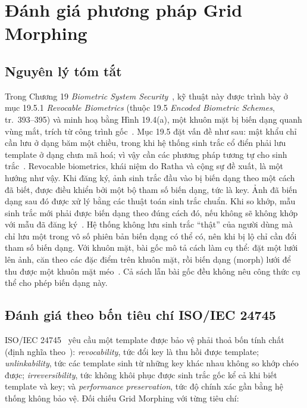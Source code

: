 \documentclass[12pt,a4paper]{article}
\begin{document}
\section{Đánh giá phương pháp Grid Morphing}

\subsection{Nguyên lý tóm tắt}
Trong Chương 19 \emph{Biometric System Security}~\cite{adler2008}, kỹ thuật này được trình bày ở mục 19.5.1 \emph{Revocable Biometrics} (thuộc 19.5 \emph{Encoded Biometric Schemes}, tr.~393--395) và minh hoạ bằng Hình 19.4(a), một khuôn mặt bị biến dạng quanh vùng mắt, trích từ công trình gốc~\cite{ratha2001}. Mục 19.5 đặt vấn đề như sau: mật khẩu chỉ cần lưu ở dạng băm một chiều, trong khi hệ thống sinh trắc cổ điển phải lưu template ở dạng chưa mã hoá; vì vậy cần các phương pháp tương tự cho sinh trắc~\cite[tr.~393]{adler2008}. Revocable biometrics, khái niệm do Ratha và cộng sự đề xuất, là một hướng như vậy. Khi đăng ký, ảnh sinh trắc đầu vào bị biến dạng theo một cách đã biết, được điều khiển bởi một bộ tham số biến dạng, tức là key. Ảnh đã biến dạng sau đó được xử lý bằng các thuật toán sinh trắc chuẩn. Khi so khớp, mẫu sinh trắc mới phải được biến dạng theo đúng cách đó, nếu không sẽ không khớp với mẫu đã đăng ký~\cite[tr.~393]{adler2008}. Hệ thống không lưu sinh trắc ``thật'' của người dùng mà chỉ lưu một trong vô số phiên bản biến dạng có thể có, nên khi bị lộ chỉ cần đổi tham số biến dạng. Với khuôn mặt, bài gốc mô tả cách làm cụ thể: đặt một lưới lên ảnh, căn theo các đặc điểm trên khuôn mặt, rồi biến dạng (morph) lưới để thu được một khuôn mặt méo~\cite[Fig.~10]{ratha2001}. Cả sách lẫn bài gốc đều không nêu công thức cụ thể cho phép biến dạng này.

\subsection{Đánh giá theo bốn tiêu chí ISO/IEC 24745}
ISO/IEC 24745~\cite{iso24745} yêu cầu một template được bảo vệ phải thoả bốn tính chất (định nghĩa theo~\cite{alam2025}): \emph{revocability}, tức đổi key là thu hồi được template; \emph{unlinkability}, tức các template sinh từ những key khác nhau không so khớp chéo được; \emph{irreversibility}, tức không khôi phục được sinh trắc gốc kể cả khi biết template và key; và \emph{performance preservation}, tức độ chính xác gần bằng hệ thống không bảo vệ. Đối chiếu Grid Morphing với từng tiêu chí:
\end{document}
